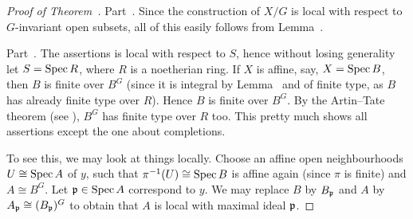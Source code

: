 \documentclass[a4paper,parskip=half,numbers=enddot, DIV=12]{scrreprt}
\begin{document}
\begin{proof}[Proof of Theorem~]
	Part~. Since the construction of $X/G$ is local with respect to $G$-invariant open subsets, all of this easily follows from Lemma~.
	
	Part~. The assertions is local with respect to $S$, hence without losing generality let $S=\operatorname{Spec} R$, where $R$ is a noetherian ring. If $X$ is affine, say, $X=\operatorname{Spec} B$, then $B$ is finite over $B^G$ (since it is integral by Lemma~ and of finite type, as $B$ has already finite type over $R$). Hence $B$ is finite over $B^G$. By the Artin--Tate theorem (see \cite[Proposition~1.4.2]{alg1}), $B^G$ has finite type over $R$ too. This pretty much shows all assertions except the one about completions.
	
	To see this, we may look at things locally. Choose an affine open neighbourhoods $U\cong \operatorname{Spec} A$ of $y$, such that $\pi^{-1}(U)\cong \operatorname{Spec} B$ is affine again (since $\pi$ is finite) and $A\cong B^G$. Let $\mathfrak{p}\in\operatorname{Spec} A$ correspond to $y$. We may replace $B$ by $B_{\mathfrak{p}}$ and $A$ by $A_{\mathfrak{p}}\cong (B_{\mathfrak{p}})^G$ to obtain that $A$ is local with maximal ideal $\mathfrak{p}$.
	

\end{proof}
\end{document}
